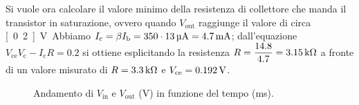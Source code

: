 \documentclass[italian,a4paper]{article}
\begin{document}
Si vuole ora calcolare il valore minimo della resistenza di collettore che
manda il transistor in saturazione, ovvero quando $V_{\text{out}}$ raggiunge il valore di circa \unit[0.2]{V}.
Abbiamo $I_{\text{c}}= \beta I_{\text{b}}= 350 \cdot \unit[13]{\micro A}= \unit[4.7]{mA}$; dall'equazione 
$V_{\text{ce}}V_{\text{c}} - I_{\text{c}}R = 0.2$ si ottiene esplicitando la resistenza $R = \dfrac{14.8}{4.7}= \unit[3.15]{k\ohm}$
a fronte di un valore misurato di $R =\unit[3.3]{k\ohm} $ e $V_{\text{ce}}= \unit[0.192]{V}$.

\begin{figure}[h]\caption{Andamento di $V_{\text{in}}$ e $V_{\text{out}}$ (\unit{V}) in funzione del tempo (\unit{ms}).}
        \centering                                     
        
    \label{fig:vinvout}
\end{figure}
\end{document}
